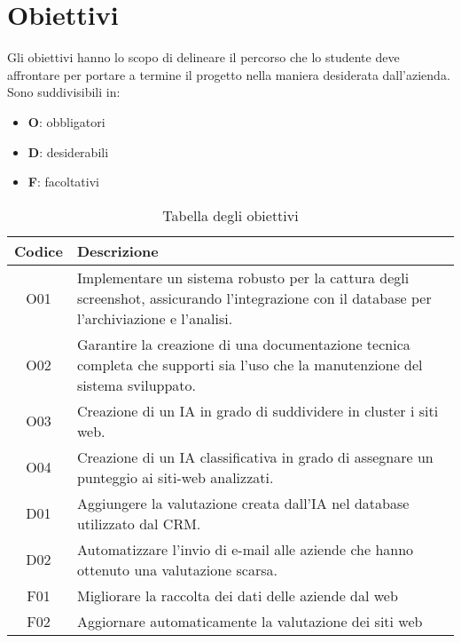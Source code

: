\section{Obiettivi}
Gli obiettivi hanno lo scopo di delineare il percorso che lo studente deve affrontare per portare a termine il progetto nella maniera desiderata dall'azienda.
Sono suddivisibili in:
\begin{itemize}
    \item \textbf{O}: obbligatori
    \item \textbf{D}: desiderabili
    \item \textbf{F}: facoltativi
\end{itemize}

\begin{table}[h!]
    \centering
    \begin{tabularx}{0.8\textwidth}{|c|X|}
    \hline
    \textbf{Codice} & \textbf{Descrizione} \\
    \hline
    O01 & Implementare un sistema robusto per la cattura degli screenshot, assicurando l’integrazione con il database per l’archiviazione e l’analisi. \\
    \hline
    O02 & Garantire la creazione di una documentazione tecnica completa che supporti sia l’uso che la manutenzione  del sistema sviluppato. \\
    \hline
    O03 & Creazione di un IA in grado di suddividere in cluster i siti web. \\
    \hline
    O04 & Creazione di un IA classificativa in grado di assegnare un punteggio ai siti-web analizzati.\\
    \hline
    D01 & Aggiungere la valutazione creata dall'IA nel database utilizzato dal CRM.\\
    \hline
    D02 & Automatizzare l'invio di e-mail alle aziende che hanno ottenuto una valutazione scarsa.\\
    \hline
    F01 & Migliorare la raccolta dei dati delle aziende dal web\\
    \hline
    F02 & Aggiornare automaticamente la valutazione dei siti web\\
    \hline
    \end{tabularx}
    \caption{Tabella degli obiettivi}
    \end{table}


